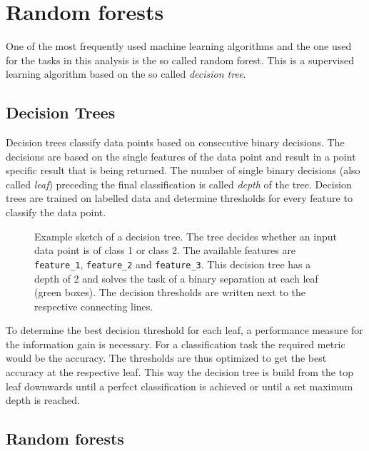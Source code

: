 \section{Random forests}
%
One of the most frequently used machine learning algorithms and the one used
for the tasks in this analysis is the so called random forest. This is a
supervised learning algorithm based on the so called \textit{decision tree}.

\subsection{Decision Trees}
%
Decision trees classify data points based on consecutive binary decisions. The
decisions are based on the single features of the data point and result in a
point specific result that is being returned. The number of single binary
decisions (also called \textit{leaf}) preceding the final classification is
called \textit{depth} of the tree. Decision trees are trained on labelled data
and determine thresholds for every feature to classify the data point.
%
\begin{figure}[H]
  \centering
  \caption{Example sketch of a decision tree. The tree decides whether an input data point is of class 1 or class 2. The available features are \texttt{feature\_1}, \texttt{feature\_2} and \texttt{feature\_3}. This decision tree has a depth of 2 and solves the task of a binary separation at each leaf (green boxes). The decision thresholds are written next to the respective connecting lines.}
  \label{fig:tree}
\end{figure}
%
To determine the best decision threshold for each leaf, a performance measure
for the information gain is necessary. For a classification task the required
metric would be the accuracy. The thresholds are thus optimized to get the best
accuracy at the respective leaf. This way the decision tree is build from the
top leaf downwards until a perfect classification is achieved or until a set
maximum depth is reached.

\subsection{Random forests}
%
